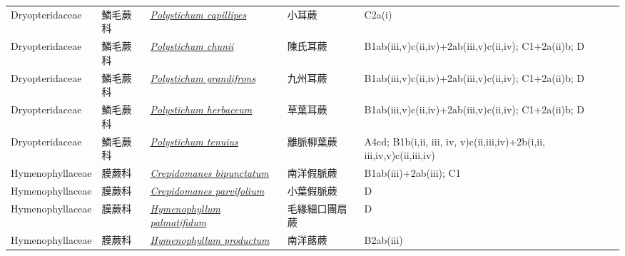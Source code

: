 {\begin{longtable}{p{2.5cm}p{2.5cm}p{4.5cm}p{2.5cm}p{3cm}}
    Dryopteridaceae & 鱗毛蕨科 & \href{http://www.theplantlist.org/tpl1.1/search?q=Polystichum+capillipes}{\textit{Polystichum capillipes} } & 小耳蕨 & C2a(i) \index{Polystichum@\textit{Polystichum}!capillipes@\textit{capillipes}}  \index{小耳蕨} \\
    Dryopteridaceae & 鱗毛蕨科 & \href{http://www.theplantlist.org/tpl1.1/search?q=Polystichum+chunii}{\textit{Polystichum chunii} } & 陳氏耳蕨 & B1ab(iii,v)c(ii,iv)+2ab(iii,v)c(ii,iv); C1+2a(ii)b; D \index{Polystichum@\textit{Polystichum}!chunii@\textit{chunii}}  \index{陳氏耳蕨} \\
    Dryopteridaceae & 鱗毛蕨科 & \href{http://www.theplantlist.org/tpl1.1/search?q=Polystichum+grandifrons}{\textit{Polystichum grandifrons} } & 九州耳蕨 & B1ab(iii,v)c(ii,iv)+2ab(iii,v)c(ii,iv); C1+2a(ii)b; D \index{Polystichum@\textit{Polystichum}!grandifrons@\textit{grandifrons}}  \index{九州耳蕨} \\
    Dryopteridaceae & 鱗毛蕨科 & \href{http://www.theplantlist.org/tpl1.1/search?q=Polystichum+herbaceum}{\textit{Polystichum herbaceum} } & 草葉耳蕨 & B1ab(iii,v)c(ii,iv)+2ab(iii,v)c(ii,iv); C1+2a(ii)b; D \index{Polystichum@\textit{Polystichum}!herbaceum@\textit{herbaceum}}  \index{草葉耳蕨} \\
    Dryopteridaceae & 鱗毛蕨科 & \href{http://www.theplantlist.org/tpl1.1/search?q=Polystichum+tenuius}{\textit{Polystichum tenuius} } & 離脈柳葉蕨 & A4cd; B1b(i,ii, iii, iv, v)c(ii,iii,iv)+2b(i,ii, iii,iv,v)c(ii,iii,iv) \index{Polystichum@\textit{Polystichum}!tenuius@\textit{tenuius}}  \index{離脈柳葉蕨} \\
    Hymenophyllaceae & 膜蕨科 & \href{http://www.theplantlist.org/tpl1.1/search?q=Crepidomanes+bipunctatum}{\textit{Crepidomanes bipunctatum} } & 南洋假脈蕨 & B1ab(iii)+2ab(iii); C1 \index{Crepidomanes@\textit{Crepidomanes}!bipunctatum@\textit{bipunctatum}}  \index{南洋假脈蕨} \\
    Hymenophyllaceae & 膜蕨科 & \href{http://www.theplantlist.org/tpl1.1/search?q=Crepidomanes+parvifolium}{\textit{Crepidomanes parvifolium} } & 小葉假脈蕨 & D \index{Crepidomanes@\textit{Crepidomanes}!parvifolium@\textit{parvifolium}}  \index{小葉假脈蕨} \\
    Hymenophyllaceae & 膜蕨科 & \href{http://www.theplantlist.org/tpl1.1/search?q=Hymenophyllum+palmatifidum}{\textit{Hymenophyllum palmatifidum} } & 毛緣細口團扇蕨 & D \index{Hymenophyllum@\textit{Hymenophyllum}!palmatifidum@\textit{palmatifidum}}  \index{毛緣細口團扇蕨} \\
    Hymenophyllaceae & 膜蕨科 & \href{http://www.theplantlist.org/tpl1.1/search?q=Hymenophyllum+productum}{\textit{Hymenophyllum productum} } & 南洋蕗蕨 & B2ab(iii) \index{Hymenophyllum@\textit{Hymenophyllum}!productum@\textit{productum}}  \index{南洋蕗蕨} \\

\end{longtable}}
